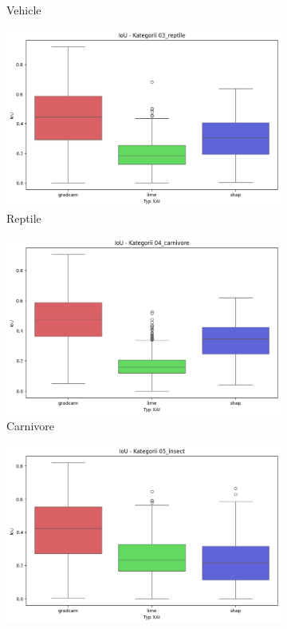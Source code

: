 \begin{figure}
\begin{subfigure}[b]{0.3\textwidth}
		\caption{Vehicle}  \label{rys:base_iou_vehicle}
	\end{subfigure}
	\begin{subfigure}[b]{0.3\textwidth}
		\centering\includegraphics[width=.9\textwidth]{img/base_iou_reptile}
		\caption{Reptile}  \label{rys:base_iou_reptile}
	\end{subfigure}
	\begin{subfigure}[b]{0.3\textwidth}
		\centering\includegraphics[width=.9\textwidth]{img/base_iou_carnivore}
		\caption{Carnivore}  \label{rys:base_iou_carnivore}
	\end{subfigure}
	\begin{subfigure}[b]{0.3\textwidth}
		\centering\includegraphics[width=.9\textwidth]{img/base_iou_insect}

\end{subfigure}
\end{figure}
